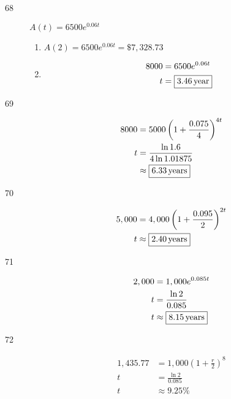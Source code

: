 \documentclass{exam}
\begin{document}
\begin{description}
      \item[68]
        $A(t) = 6500 e^{0.06 t}$

        \begin{enumerate}[a]
          \item $A(2) = 6500 e^{0.06 t} = \boxed{\$7,328.73}$

          \item
            \begin{align*}
              8000 &= 6500 e^{0.06 t} \\
              t     &= \boxed{\unit[3.46]{year}} \\
            \end{align*}
        \end{enumerate}

      \item[69]
        \begin{align*}
          8000    &= 5000 \left( 1 + \frac{0.075}{4} \right)^{4t} \\
          t       &= \frac{\ln 1.6}{4 \ln 1.01875} \\
                  &\approx \boxed{\unit[6.33]{years}} \\
        \end{align*}

      \item[70]
        \begin{align*}
          5,000 & = 4,000 \left( 1 + \frac{0.095}{2} \right)^{2t} \\
          t     & \approx \boxed{\unit[2.40]{years}} \\
        \end{align*}

      \item[71]
        \begin{align*}
          2,000 & = 1,000 e^{0.085t} \\
          t     & = \frac{\ln 2}{0.085} \\
          t     & \approx \boxed{\unit[8.15]{years}} \\
        \end{align*}

      \item[72]
        \begin{align*}
          1,435.77 &= 1,000 \left( 1 + \frac{r}{2} \right)^8 \\
          t &= \frac{\ln 2}{0.085} \\
          t     & \approx \boxed{9.25\%} \\
        \end{align*}


\end{description}
\end{document}
